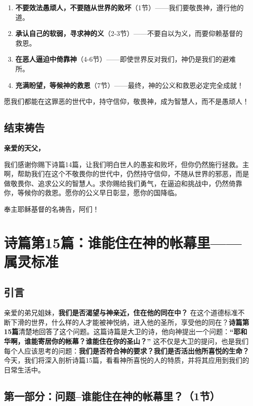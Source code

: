 \documentclass[a4paper, 12pt]{article}
\begin{document}
\begin{enumerate}
    \item \textbf{不要效法愚顽人，不要随从世界的败坏}（1节）——我们要敬畏神，遵行他的道。 
    \item \textbf{承认自己的软弱，寻求神的义}（2-3节）——不要自以为义，而要仰赖基督的救恩。 
    \item \textbf{在恶人逼迫中倚靠神}（4-6节）——即使世界反对我们，神仍是我们的避难所。 
    \item \textbf{充满盼望，等候神的救恩}（7节）——最终，神的公义和救恩必定完全成就！  
\end{enumerate}

愿我们都能在这罪恶的世代中，持守信仰，敬畏神，成为智慧人，而不是愚顽人！  



\subsection*{结束祷告}
\textbf{亲爱的天父，}

我们感谢你赐下诗篇14篇，让我们明白世人的愚妄和败坏，但你仍然施行拯救。主啊，帮助我们在这个不敬畏你的世代中，仍然持守信仰，不随从世界的邪恶，而是做敬畏你、追求公义的智慧人。求你赐给我们勇气，在逼迫和挑战中，仍然倚靠你，等候你的救恩。愿你的公义早日彰显，愿你的国降临。

奉主耶稣基督的名祷告，阿们！

\newpage
\section{诗篇第15篇：谁能住在神的帐幕里——属灵标准}

\subsection*{引言}
亲爱的弟兄姐妹，\textbf{我们是否渴望与神亲近，住在他的同在中？} 在这个道德标准不断下滑的世界，什么样的人才能被神悦纳，进入他的圣所，享受他的同在？\textbf{诗篇第15篇}清楚地回答了这个问题。这篇诗篇是大卫的诗，他向神提出一个问题：\textbf{“耶和华啊，谁能寄居你的帐幕？谁能住在你的圣山？”} 这不仅是大卫的提问，也是我们每个人应该思考的问题：\textbf{我们是否符合神的要求？我们是否活出他所喜悦的生命？}  今天，我们将深入剖析诗篇15篇，看看神所喜悦的人的特质，并将其应用到我们的日常生活中。  


\subsection*{第一部分：问题--谁能住在神的帐幕里？（1节）}
\end{document}
